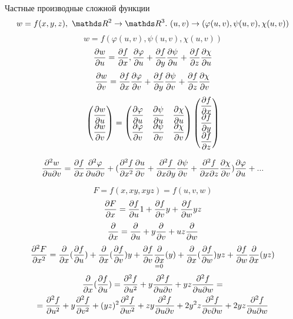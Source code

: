 \documentclass[12pt, fleqn]{article}
\begin{document}
Частные производные сложной функции
\[w=f(x,y,z),\ \R^2 \ra \R^3.\ (u,v) \ra(\varphi(u,v), \psi(u,v), \chi(u,v))\]
\[w=f(\varphi(u,v), \psi(u,v), \chi(u,v))\]
\[\frac{\partial w}{\partial u}=\frac{\partial f}{\partial x}, \frac{\partial \varphi}{\partial u}+ \frac{\partial f}{\partial y} \frac{\partial \psi}{\partial u}+\frac{\partial f}{\partial z} \frac{\partial \chi}{\partial u}\]
\[\frac{\partial w}{\partial v}=\frac{\partial f}{\partial x} \frac{\partial \varphi}{\partial v}+\frac{\partial f}{\partial y} \frac{\partial \psi}{\partial v}+ \frac{\partial f}{\partial z} \frac{\partial \chi}{\partial v}\]
\[
\begin{pmatrix}
\dfrac{\partial w}{\partial u}\\
\dfrac{\partial w}{\partial v}
\end{pmatrix}=
\begin{pmatrix}
\dfrac{\partial \varphi}{\partial u} & \dfrac{\partial \psi}{\partial u} & \dfrac{\partial \chi}{\partial u}\\
\dfrac{\partial \varphi}{\partial v} & \dfrac{\partial \psi}{\partial v} & \dfrac{\partial \chi}{\partial v}
\end{pmatrix}
\begin{pmatrix}
\dfrac{\partial f}{\partial x}\\
\dfrac{\partial f}{\partial y}\\
\dfrac{\partial f}{\partial z}
\end{pmatrix}
\]

\begin{Example}
    \[\frac{\partial^2 w}{\partial u \partial v} = \frac{\partial f}{\partial x} \frac{\partial^2 \varphi}{\partial u \partial v}+(\frac{\partial^2 f}{\partial x^2} \frac{\partial u}{\partial v}+\frac{\partial^2 f}{\partial x \partial y} \frac{\partial \psi}{\partial v}+\frac{\partial^2 f}{\partial x \partial z} \frac{\partial \chi}{\partial v}) \frac{\partial \varphi}{\partial u}+...\]
\end{Example}

\begin{Example}
    \[F=f(x,x y, x y z)=f(u,v,w)\]
    \[\frac{\partial F}{\partial x}=\frac{\partial f}{\partial u} 1+ \frac{\partial f}{\partial v} y + \frac{\partial f}{\partial w} yz\]
    \[\frac{\partial}{\partial x}=\frac{\partial}{\partial u}+y \frac{\partial}{\partial v}+uz \frac{\partial}{\partial w}\]
    \[\frac{\partial^2 F}{\partial x^2} = \frac{\partial}{\partial x}(\frac{\partial f}{\partial u})+ \frac{\partial}{\partial x}(\frac{\partial f}{\partial v}) y + \underset{=0}{\frac{\partial f}{\partial v} \frac{\partial}{\partial x} (y)}+ \frac{\partial}{\partial x} (\frac{\partial f}{\partial w}) yz + \frac{\partial f}{\partial w} \frac{\partial}{\partial x} (yz)\]
    \begin{multline*}
        \frac{\partial}{\partial x} (\frac{\partial f}{\partial u})=\frac{\partial^2 f}{\partial u^2}+ y \frac{\partial^2 f}{\partial u \partial v}+yz \frac{\partial^2 f}{\partial u \partial w} =\\ = \frac{\partial^2 f}{\partial u^2}+y \frac{\partial^2 f}{\partial v^2}+(yz)^2 \frac{\partial^2 f}{\partial w^2}+z y \frac{\partial^2 f}{\partial u \partial v} + 2y^2 z \frac{\partial^2 f}{\partial v \partial w} + 2yz \frac{\partial^2 f}{\partial u \partial w}
    \end{multline*}
\end{Example}
\end{document}
